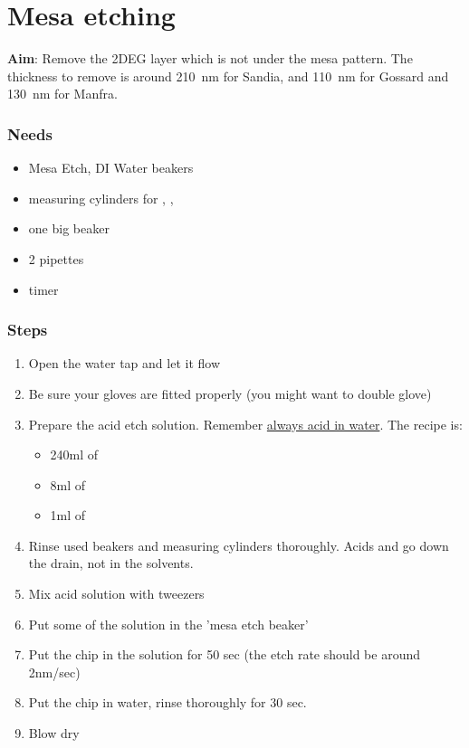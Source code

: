 \section{Mesa etching}

\textbf{Aim}:
Remove the 2DEG layer which is not under the mesa pattern. The thickness to remove is around \SI{210}{\nano\meter} for Sandia, and \SI{110}{\nano\meter} for Gossard
and \SI{130}{\nano\meter} for Manfra.

\subsubsection{Needs}
\begin{itemize}[noitemsep]
\item Mesa Etch, DI Water beakers
\item measuring cylinders for , , 
\item one big beaker
\item 2 pipettes
\item timer
\end{itemize}

\subsubsection{Steps}
\begin{enumerate}
\item Open the water tap and let it flow
\item Be sure your gloves are fitted properly (you might want to double glove)
\item Prepare the acid etch solution. Remember \underline{always acid in water}. The recipe is:
  \begin{itemize}
  \item 240ml of 
  \item 8ml of 
  \item 1ml of 
  \end{itemize}
\item Rinse used beakers and measuring cylinders thoroughly. Acids and  go down the drain, not in the solvents.
\item Mix acid solution with tweezers
\item Put some of the solution in the 'mesa etch beaker'
\item Put the chip in the solution for 50 sec (the etch rate should be around 2nm/sec)
\item Put the chip in water, rinse thoroughly for 30 sec.
\item Blow dry
\end{enumerate}
